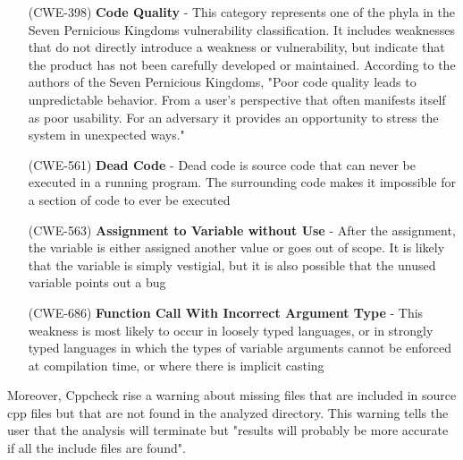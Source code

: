 \begin{itemize}
	\item[(CWE-398) ] \textbf{Code Quality} - This category represents one of the phyla in the Seven Pernicious Kingdoms vulnerability classification. It includes weaknesses that do not directly introduce a weakness or vulnerability, but indicate that the product has not been carefully developed or maintained. According to the authors of the Seven Pernicious Kingdoms, "Poor code quality leads to unpredictable behavior. From a user's perspective that often manifests itself as poor usability. For an adversary it provides an opportunity to stress the system in unexpected ways." \cite{bibitem3}
	\item[(CWE-561) ] \textbf{Dead Code} - Dead code is source code that can never be executed in a running program. The surrounding code makes it impossible for a section of code to ever be executed \cite{bibitem4}
	\item[(CWE-563) ] \textbf{Assignment to Variable without Use} - After the assignment, the variable is either assigned another value or goes out of scope. It is likely that the variable is simply vestigial, but it is also possible that the unused variable points out a bug \cite{bibitem5}
	\item[(CWE-686) ] \textbf{Function Call With Incorrect Argument Type} - This weakness is most likely to occur in loosely typed languages, or in strongly typed languages in which the types of variable arguments cannot be enforced at compilation time, or where there is implicit casting \cite{bibitem6}
\end{itemize}

Moreover, Cppcheck rise a warning about missing files that are included in source cpp files but that are not found in the analyzed directory.\newline
This warning tells the user that the analysis will terminate but "results will probably be more accurate if all the include files are found".\newline\newline

